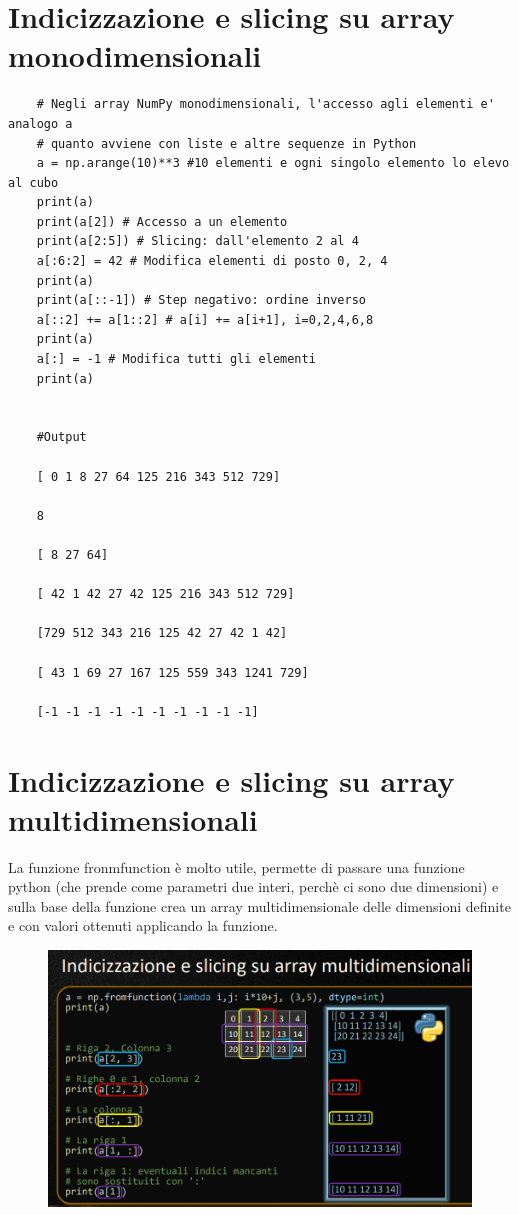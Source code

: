 \section{Indicizzazione e slicing su array monodimensionali}

\begin{lstlisting}
	# Negli array NumPy monodimensionali, l'accesso agli elementi e' analogo a
	# quanto avviene con liste e altre sequenze in Python
	a = np.arange(10)**3 #10 elementi e ogni singolo elemento lo elevo al cubo
	print(a)
	print(a[2]) # Accesso a un elemento
	print(a[2:5]) # Slicing: dall'elemento 2 al 4
	a[:6:2] = 42 # Modifica elementi di posto 0, 2, 4
	print(a)
	print(a[::-1]) # Step negativo: ordine inverso
	a[::2] += a[1::2] # a[i] += a[i+1], i=0,2,4,6,8
	print(a)
	a[:] = -1 # Modifica tutti gli elementi
	print(a)

	
	#Output
	
	[ 0 1 8 27 64 125 216 343 512 729]
	
	8
	
	[ 8 27 64]
	
	[ 42 1 42 27 42 125 216 343 512 729]
	
	[729 512 343 216 125 42 27 42 1 42]
	
	[ 43 1 69 27 167 125 559 343 1241 729]
	
	[-1 -1 -1 -1 -1 -1 -1 -1 -1 -1]
\end{lstlisting}

\newpage

\section{Indicizzazione e slicing su array multidimensionali}

La funzione fronmfunction è molto utile, permette di passare una funzione python (che prende come parametri due interi, perchè ci sono due dimensioni) e sulla base della funzione crea un array multidimensionale delle dimensioni definite e con valori ottenuti applicando la funzione.

\begin{figure}[ht]
	\includegraphics[width=450pt]{./immagini/slicing_array_multidimensionali.png}
	\label{img:slicing_array_multidimensionali}
\end{figure}

